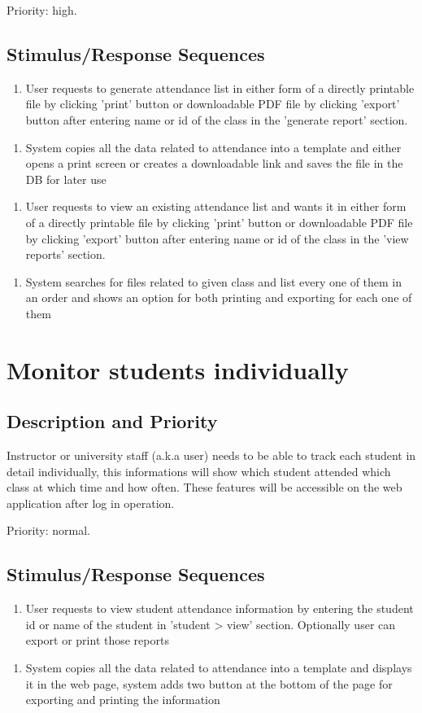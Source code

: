 \documentclass{scrreprt}
\newcommand{\stimulus}[1] {
  \begin{enumerate}[leftmargin=5.7\parindent, label=Stimulus:]
  \item #1
  \end{enumerate}
  
  }
\newcommand{\response}[1] {
  \smallskip
  \begin{enumerate}[leftmargin=6\parindent, label=Response:]
  \item #1
  \end{enumerate}
  }
\begin{document}
\vspace{2mm}
Priority: high.

\subsection{Stimulus/Response Sequences}

\stimulus{User requests to generate attendance list in either form of a directly printable file by clicking 'print' button or downloadable PDF file by clicking 'export' button after entering name or id of the class in the 'generate report' section.}
\response{ System copies all the data related to attendance into a template and either opens a print screen or creates a downloadable link and saves the file in the DB for later use}

\vspace{5mm}
\stimulus{User requests to view an existing attendance list and wants it in either form of a directly printable file by clicking 'print' button or downloadable PDF file by clicking 'export' button after entering name or id of the class in the 'view reports' section.}
\response{ System searches for files related to given class and list every one of them in an order and shows an option for both printing and exporting for each one of them}

\section{Monitor students individually}

\subsection{Description and Priority}
Instructor or university staff (a.k.a user) needs to be able to track each student in detail individually, this informations will show which student attended which class at which time and how often. These features will be accessible on the web application after log in operation.

\vspace{2mm}
Priority: normal.

\subsection{Stimulus/Response Sequences}

\stimulus{User requests to view student attendance information by entering the student id or name of the student in 'student > view' section. Optionally user can export or print those reports}
\response{ System copies all the data related to attendance into a template and displays it in the web page, system adds two button at the bottom of the page for exporting and printing the information}
\end{document}
